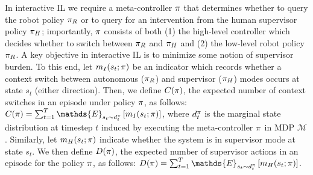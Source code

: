 In interactive IL we require a meta-controller $\pi$ that determines whether to query the robot policy $\pi_{R}$ or to query for an intervention from the human supervisor policy $\pi_{H}$; importantly, $\pi$ consists of both (1) the high-level controller which decides whether to switch between $\pi_{R}$ and $\pi_{H}$ and (2) the low-level robot policy $\pi_{R}$. A key objective in interactive IL is to minimize some notion of supervisor burden. To this end, let $m_I(s_t; \pi)$ be an indicator which records whether a context switch between autonomous ($\pi_{R}$) and supervisor ($\pi_{H}$) modes occurs at state $s_t$ (either direction). Then, we define $C(\pi)$, the expected number of context switches in an episode under policy $\pi$, as follows: ${C(\pimeta) = \sum_{t=1}^{T} \mathds{E}_{s_t \sim d^{\pimeta}_t} \left[ \indicatorint(s_t; \pimeta) \right]}$, where $d^{\pi}_t$ is the marginal state distribution at timestep $t$ induced by executing the meta-controller $\pi$ in MDP $\mathcal{M}$. %
Similarly, let $m_H(s_t; \pi)$ indicate whether the system is in supervisor mode at state $s_t$. We then define $D(\pi)$, the expected number of supervisor actions in an episode for the policy $\pi$, as follows: ${D(\pimeta) = \sum_{t=1}^{T} \mathds{E}_{s_t \sim d^\pimeta_t} \left[ \indicatorsup(s_t; \pimeta) \right]}$.

